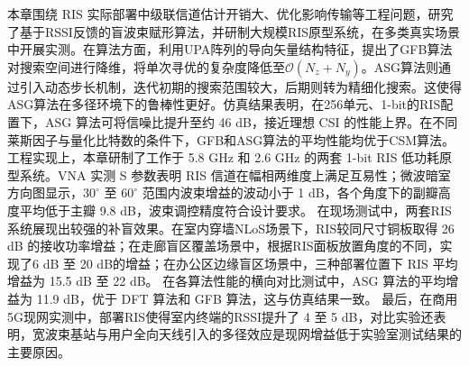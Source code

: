 本章围绕 RIS 实际部署中级联信道估计开销大、优化影响传输等工程问题，研究了基于RSSI反馈的盲波束赋形算法，并研制大规模RIS原型系统，在多类真实场景中开展实测。在算法方面，利用UPA阵列的导向矢量结构特征，提出了GFB算法对搜索空间进行降维，将单次寻优的复杂度降低至$\mathcal{O}(N_z + N_y)$。ASG算法则通过引入动态步长机制，迭代初期的搜索范围较大，后期则转为精细化搜索。这使得ASG算法在多径环境下的鲁棒性更好。仿真结果表明，在256单元、1-bit的RIS配置下，ASG 算法可将信噪比提升至约 46 dB，接近理想 CSI 的性能上界。在不同莱斯因子与量化比特数的条件下，GFB和ASG算法的平均性能均优于CSM算法。
工程实现上，本章研制了工作于 5.8 GHz 和 2.6 GHz 的两套 1-bit RIS 低功耗原型系统。VNA 实测 S 参数表明 RIS 信道在幅相两维度上满足互易性；微波暗室方向图显示，$30^\circ$ 至 $60^\circ$ 范围内波束增益的波动小于 1 dB，各个角度下的副瓣高度平均低于主瓣 9.8 dB，波束调控精度符合设计要求。
在现场测试中，两套RIS系统展现出较强的补盲效果。在室内穿墙NLoS场景下，RIS较同尺寸铜板取得 26 dB 的接收功率增益；在走廊盲区覆盖场景中，根据RIS面板放置角度的不同，实现了6 dB 至 20 dB的增益；在办公区边缘盲区场景中，三种部署位置下 RIS 平均增益为 15.5 dB 至 22 dB。
在各算法性能的横向对比测试中，ASG 算法的平均增益为 11.9 dB，优于 DFT 算法和 GFB 算法，这与仿真结果一致。
最后，在商用5G现网实测中，部署RIS使得室内终端的RSSI提升了 4 至 5 dB，对比实验还表明，宽波束基站与用户全向天线引入的多径效应是现网增益低于实验室测试结果的主要原因。

